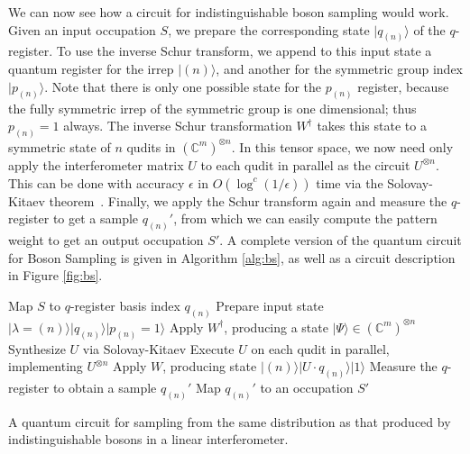 We can now see how a circuit for indistinguishable boson sampling would work. 
Given an input occupation $S$, we prepare the corresponding state $|q_{(n)}\rangle$ of the $q$-register. 
To use the inverse Schur transform, we append to this input state a quantum register for the irrep $|(n)\rangle$, and another for the symmetric group index $|p_{(n)}\rangle$. 
Note that there is only one possible state for the $p_{(n)}$ register, because the fully symmetric irrep of the symmetric group is one dimensional; thus $p_{(n)}=1$ always.
The inverse Schur transformation $W^\dag$ takes this state to a symmetric state of $n$ qudits in $(\mathbb{C}^m)^{\otimes n}$.
 In this tensor space, we now need only apply the interferometer matrix $U$ to each qudit in parallel as the circuit $U^{\otimes n}$.
This can be done with accuracy $\epsilon$ in $O(\log^c(1/\epsilon))$ time via the Solovay-Kitaev theorem~\cite{nielsen2010, dawson2006}. 
Finally, we apply the Schur transform again and measure the $q$-register to get a sample $q_{(n)}'$, from which we can easily compute the pattern weight to get an output occupation $S'$.
A complete version of the quantum circuit for Boson Sampling is given in Algorithm \ref{alg:bs}, as well as a circuit description in Figure \ref{fig:bs}.
\begin{algorithm}
\BlankLine
Map $S$ to $q$-register basis index $q_{(n)}$\;
Prepare input state $|\lambda=(n)\rangle|q_{(n)}\rangle|p_{(n)}=1\rangle$\;
Apply $W^\dagger$, producing a state $|\Psi\rangle \in (\mathbb{C}^m)^{\otimes n}$\;
Synthesize $U$ via Solovay-Kitaev\;
Execute $U$ on each qudit in parallel, implementing $U^{\otimes n}$\;
Apply $W$, producing state $|(n)\rangle|U\cdot q_{(n)}\rangle|1\rangle$\; 
Measure the $q$-register to obtain a sample $q_{(n)}'$\;
Map $q_{(n)}'$ to an occupation $S'$\;
\caption{
A quantum circuit for sampling from the same distribution as that produced by indistinguishable bosons in a linear interferometer.}
\label{alg:bs}
\end{algorithm}

